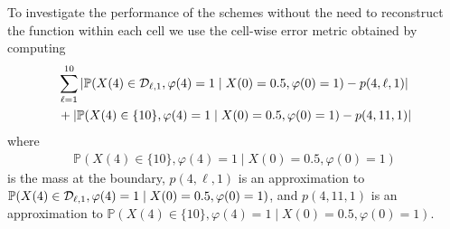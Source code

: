 To investigate the performance of the schemes without the need to reconstruct the function within each cell we use the cell-wise error metric obtained by computing 
\begin{align}
	&\sum_{\ell=1}^{10} \left|\mathbb P(X(4)\in\mathcal{D}_{\ell,1}, \varphi(4)=1\mid X(0)=0.5,\varphi(0)=1)-p(4,\ell,1)\right|\nonumber 
	\\&+\left|\mathbb P(X(4)\in\{10\}, \varphi(4)=1\mid X(0)=0.5,\varphi(0)=1)-p(4,11,1)\right| \label{eqn: cell errors}
\end{align}
where 
\begin{align}
	\mathbb P(X(4)\in\{10\}, \varphi(4)=1\mid X(0)=0.5,\varphi(0)=1) \label{eqn: cell probs boundary}
\end{align}
is the mass at the boundary, \(p(4,\ell,1)\) is an approximation to \(\mathbb P(X(4)\in\mathcal{D}_{\ell,1}, \varphi(4)=1\mid X(0)=0.5,\varphi(0)=1)\), and \(p(4,11,1)\) is an approximation to \(\mathbb P(X(4)\in\{10\}, \varphi(4)=1\mid X(0)=0.5,\varphi(0)=1)\).

